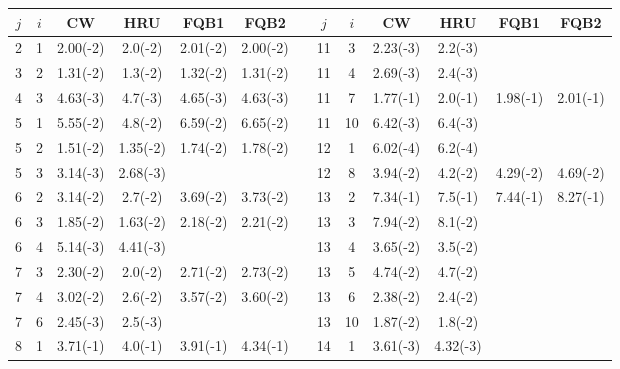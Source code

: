 \documentclass[useAMS,usenatbib]{mn2e}
\begin{document}
\begin{table}
\begin{tabular}{ccccccccccccc}
         $j$ &          $i$ &         CW &        HRU & FQB1 & FQB2 &  &       $j$ &          $i$ &         CW &        HRU & FQB1 & FQB2  \\
\hline
%
2  &          1 &   2.00(-2) & 2.0(-2)  & 2.01(-2) & 2.00(-2) &            &         11 &          3 &   2.23(-3) & 2.2(-3) &          &          \\
3  &          2 &   1.31(-2) & 1.3(-2)  & 1.32(-2) & 1.31(-2) &            &         11 &          4 &   2.69(-3) & 2.4(-3) &          &          \\
4  &          3 &   4.63(-3) & 4.7(-3)  & 4.65(-3) & 4.63(-3) &            &         11 &          7 &   1.77(-1) & 2.0(-1) & 1.98(-1) & 2.01(-1) \\
5  &          1 &   5.55(-2) & 4.8(-2)  & 6.59(-2) & 6.65(-2) &            &         11 &         10 &   6.42(-3) & 6.4(-3) &          &          \\
5  &          2 &   1.51(-2) & 1.35(-2) & 1.74(-2) & 1.78(-2) &            &         12 &          1 &   6.02(-4) & 6.2(-4) &          &          \\
5  &          3 &   3.14(-3) & 2.68(-3) &          &          &            &         12 &          8 &   3.94(-2) & 4.2(-2) & 4.29(-2) & 4.69(-2) \\
6  &          2 &   3.14(-2) & 2.7(-2)  & 3.69(-2) & 3.73(-2) &            &         13 &          2 &   7.34(-1) & 7.5(-1) & 7.44(-1) & 8.27(-1) \\
6  &          3 &   1.85(-2) & 1.63(-2) & 2.18(-2) & 2.21(-2) &            &         13 &          3 &   7.94(-2) & 8.1(-2) &          &          \\
6  &          4 &   5.14(-3) & 4.41(-3) &          &          &            &         13 &          4 &   3.65(-2) & 3.5(-2) &          &          \\
7  &          3 &   2.30(-2) & 2.0(-2)  & 2.71(-2) & 2.73(-2) &            &         13 &          5 &   4.74(-2) & 4.7(-2) &          &          \\
7  &          4 &   3.02(-2) & 2.6(-2)  & 3.57(-2) & 3.60(-2) &            &         13 &          6 &   2.38(-2) & 2.4(-2) &          &          \\
7  &          6 &   2.45(-3) & 2.5(-3)  &          &          &            &         13 &         10 &   1.87(-2) & 1.8(-2) &          &          \\
8  &          1 &   3.71(-1) & 4.0(-1)  & 3.91(-1) & 4.34(-1) &            &         14 &          1 &   3.61(-3) & 4.32(-3)&          &          \\

\end{tabular}
\end{table}
\end{document}
